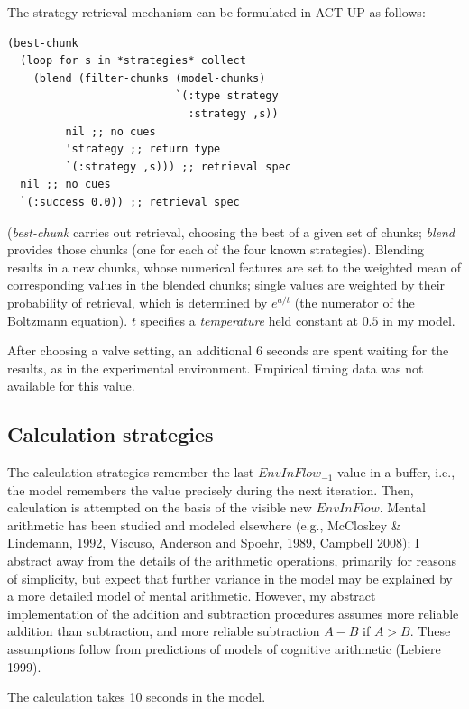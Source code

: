 \documentclass[twocolumn]{article}
\begin{document}
The strategy retrieval mechanism can be formulated in ACT-UP as follows:

\begin{verbatim}
(best-chunk  
  (loop for s in *strategies* collect  
    (blend (filter-chunks (model-chunks)
                          `(:type strategy 
                            :strategy ,s)) 
         nil ;; no cues
         'strategy ;; return type
         `(:strategy ,s))) ;; retrieval spec
  nil ;; no cues
  `(:success 0.0)) ;; retrieval spec 
\end{verbatim}

(\emph{best-chunk} carries out retrieval, choosing the best of a given set of chunks; \emph{blend} provides those chunks (one for each of the four known strategies).   Blending results in a new chunks, whose numerical features are set to the weighted mean of corresponding values in the blended chunks; single values are weighted by their probability of retrieval, which is determined by $e^{a/t}$  (the numerator of the Boltzmann equation).  $t$ specifies a \emph{temperature} held constant at $0.5$ in my model.

After choosing a valve setting, an additional $6$ seconds are spent waiting for the results, as in the experimental environment.  Empirical timing data was not available for this value.


\subsection{Calculation strategies}
\label{sec:calculation-model}

The calculation strategies remember the last $EnvInFlow_{-1}$ value in a buffer, i.e., the model remembers the value precisely during the next iteration.  Then, calculation is attempted on the basis of the visible new $EnvInFlow$.  Mental arithmetic has been studied and modeled elsewhere (e.g., McCloskey \& Lindemann, 1992, Viscuso, Anderson and Spoehr, 1989, Campbell 2008); I abstract away from the details of the arithmetic operations, primarily for reasons of simplicity, but expect that further variance in the model may be explained by a more detailed model of mental arithmetic.  However, my abstract implementation of the addition and subtraction procedures assumes more reliable addition than subtraction, and more reliable subtraction $A-B$ if $A>B$.  These assumptions follow from predictions of models of cognitive arithmetic (Lebiere 1999).   

The calculation takes 10 seconds in the model.
\end{document}
